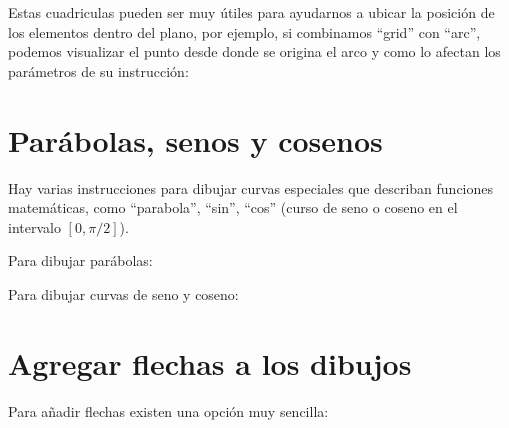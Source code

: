 \documentclass[12pt,letterpaper]{article}
\begin{document}
Estas cuadriculas pueden ser muy útiles para ayudarnos a ubicar la posición de los elementos dentro del plano, por ejemplo, si combinamos ``grid'' con ``arc'', podemos visualizar el punto desde donde se origina el arco y como lo afectan los parámetros de su instrucción:



\section*{Parábolas, senos y cosenos}

Hay varias instrucciones para dibujar curvas especiales que describan funciones matemáticas, como ``parabola'', ``sin'', ``cos'' (curso de seno o coseno en el intervalo $ [0,\pi/2] $).

Para dibujar parábolas:


Para dibujar curvas de seno y coseno:


\section*{Agregar flechas a los dibujos}

Para añadir flechas existen una opción muy sencilla:

\end{document}
